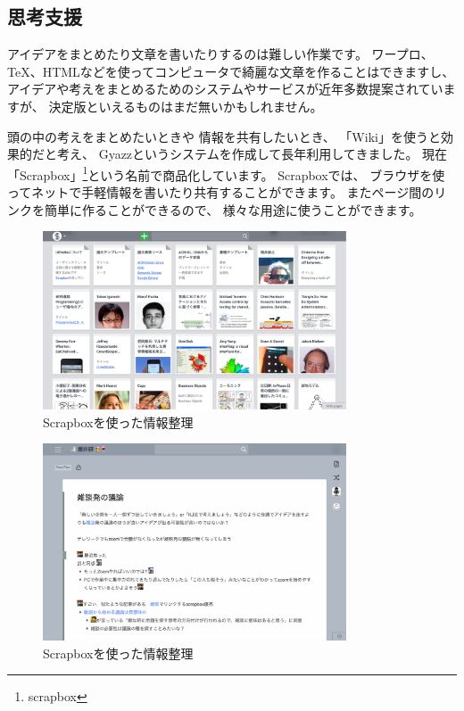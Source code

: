 \documentclass[topics]{compsoft} %
\begin{document}
\subsection{思考支援}

アイデアをまとめたり文章を書いたりするのは難しい作業です。
ワープロ、{\TeX}、HTMLなどを使ってコンピュータで綺麗な文章を作ることはできますし、
アイデアや考えをまとめるためのシステムやサービスが近年多数提案されていますが、
決定版といえるものはまだ無いかもしれません。

頭の中の考えをまとめたいときや
情報を共有したいとき、
「Wiki」を使うと効果的だと考え、
Gyazz\cite{gyazz}というシステムを作成して長年利用してきました。
現在「Scrapbox」\footnote{scrapbox}という名前で商品化しています。
Scrapboxでは、
ブラウザを使ってネットで手軽情報を書いたり共有することができます。
またページ間のリンクを簡単に作ることができるので、
様々な用途に使うことができます。

\begin{figure}[t]
  \includegraphics[width=9cm,bb=0 0 2607 1535]{figures/13982c755fdc0c60af2548c0a6589543.png}
  \caption{Scrapboxを使った情報整理}
  \label{example1}
\end{figure}

\begin{figure}[t]
  \includegraphics[width=9cm,bb=0 0 2235 1452]{figures/cca2e0eaed298ea4952a26d2effa238c.png}
  \caption{Scrapboxを使った情報整理}
  \label{example1}
\end{figure}
\end{document}
